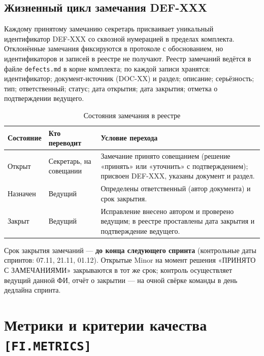 \documentclass[12pt,a4paper]{article}
\begin{document}
\subsection{Жизненный цикл замечания DEF-XXX}

Каждому принятому замечанию секретарь присваивает уникальный идентификатор
DEF-XXX со сквозной нумерацией в пределах комплекта. Отклонённые замечания
фиксируются в протоколе с обоснованием, но идентификаторов и записей в реестре
не получают. Реестр замечаний ведётся в файле \texttt{defects.md} в корне
комплекта; по каждой записи хранятся: идентификатор; документ-источник (DOC-XX)
и раздел; описание; серьёзность; тип; ответственный; статус; дата открытия;
дата закрытия; отметка о подтверждении ведущего.

\begin{table}[h!]
  \centering
  \caption{Состояния замечания в реестре}
  \label{tab:deflifecycle}
  \begin{tabularx}{\textwidth}{
    >{\raggedright\arraybackslash}p{2.4cm}
    >{\raggedright\arraybackslash}p{3.8cm}
    >{\raggedright\arraybackslash}X}
    \toprule
    \textbf{Состояние} & \textbf{Кто переводит} & \textbf{Условие перехода} \\
    \midrule
    Открыт & Секретарь, на совещании &
    Замечание принято совещанием (решение «принять» или «уточнить» с
    подтверждением); присвоен DEF-XXX, указаны документ и раздел. \\
    \addlinespace
    Назначен & Ведущий &
    Определены ответственный (автор документа) и срок закрытия. \\
    \addlinespace
    Закрыт & Ведущий &
    Исправление внесено автором и проверено ведущим; в реестре проставлены
    дата закрытия и подтверждение ведущего. \\
    \bottomrule
  \end{tabularx}
\end{table}

Срок закрытия замечаний --- \textbf{до конца следующего спринта}
(контрольные даты спринтов: 07.11, 21.11, 01.12). Открытые Minor на момент
решения «ПРИНЯТО С ЗАМЕЧАНИЯМИ» закрываются в тот же срок; контроль
осуществляет ведущий данной ФИ, отчёт о закрытии --- на очной свёрке команды в
день дедлайна спринта.

\section{Метрики и критерии качества \texttt{[FI.METRICS]}}
\end{document}
